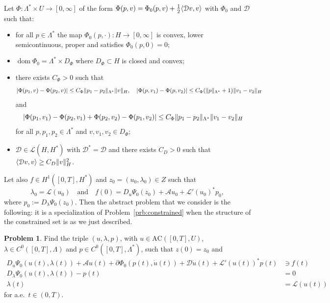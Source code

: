 \documentclass[a4paper,10pt,oneside]{amsbook}
\numberwithin{section}{chapter}
\numberwithin{equation}{chapter}
\theoremstyle{definition}
\newtheorem{prb}[prop]{Problem}
\DeclareMathOperator{\dom}{dom}
\DeclarePairedDelimiter{\norm}{\lVert}{\rVert}
\DeclarePairedDelimiter{\dual}{\langle}{\rangle}
\begin{document}
Let $\Phi\colon\Lambda^*\times U\to[0,\infty]$ of the form $\Phi(p,v)=\Phi_0(p,v)+\frac{1}{2}\dual{\mathcal{D}v,v}$ with $\Phi_0$ and $\mathcal{D}$ such that:
\begin{itemize}
\item[($\Phi$1)] for all $p\in\Lambda^*$ the map $\Phi_0(p,\cdot)\colon H\to[0,\infty]$ is convex, lower semicontinuous, proper and satisfies $\Phi_0(p,0)=0$;
\item[($\Phi$2)] $\dom\Phi_0=\Lambda^*\times D_\Phi$ where $D_\Phi\subset H$ is closed and convex;
\item[($\Phi$3)] there exists $C_\Phi>0$ such that
\[
|\Phi(p_1,v)-\Phi(p_2,v)|\le C_\Phi\norm{p_1-p_2}_{\Lambda^*}\norm{v}_H,\quad|\Phi(p,v_1)-\Phi(p,v_2)|\le C_\Phi(\norm{p}_{\Lambda^*}+1)\norm{v_1-v_2}_H
\]
and
\[
|\Phi(p_1,v_1)-\Phi(p_2,v_1)+\Phi(p_2,v_2)-\Phi(p_1,v_2)|\le C_\Phi\norm{p_1-p_2}_{\Lambda^*}\norm{v_1-v_2}_H
\]
for all $p,p_1,p_2\in\Lambda^*$ and $v,v_1,v_2\in D_\Phi$;
\item[(D)] $\mathcal{D}\in\mathscr{L}(H,H^*)$ with $\mathcal{D}^*=\mathcal{D}$ and there exists $C_D>0$ such that $\dual{\mathcal{D}v,v}\ge C_D\norm{v}_H^2$.
\end{itemize}
Let also $f\in H^1([0,T],H^*)$ and $z_0=(u_0,\lambda_0)\in Z$ such that
\begin{equation}
\label{eqn:initial-stability}
\lambda_0=\mathcal{L}(u_0)\quad\text{and}\quad f(0)=D_u\Psi_0(z_0)+\mathcal{A}u_0+\mathcal{L}'(u_0)^*p_0,
\end{equation}
where $p_0:=D_\lambda\Psi_0(z_0)$. Then the abstract problem that we consider is the following: it is a specialization of Problem~\ref{prb:constrained} when the structure of the constrained set is as we just described.
\begin{prb}
\label{prb:existence-abstract}
Find the triple $(u,\lambda,p)$, with $u\in\text{AC}([0,T],U)$, $\lambda\in C^0([0,T],\Lambda)$ and $p\in C^0([0,T],\Lambda^*)$, such that $z(0)=z_0$ and
\begin{align}
\label{eqn:problem-abstract-first}
D_u\Psi_0(u(t),\lambda(t))+\mathcal{A}u(t)+\partial\Phi_0(p(t),\dot u(t))+\mathcal{D}\dot u(t)+\mathcal{L}'(u(t))^*p(t)&\ni f(t) \\
\label{eqn:problem-abstract-second}
D_\lambda\Psi_0(u(t),\lambda(t))-p(t)&=0 \\
\label{eqn:problem-abstract-third}
\lambda(t)&=\mathcal{L}(u(t))
\end{align}
for a.e.\ $t\in(0,T)$.
\end{prb}
\end{document}
